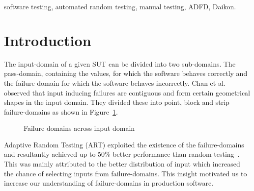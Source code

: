 \documentclass[conference]{IEEEtran}
\begin{document}
\begin{IEEEkeywords}
software testing, automated random testing, manual testing, ADFD, Daikon.
\end{IEEEkeywords}


\IEEEpeerreviewmaketitle




\section{Introduction}\label{sec:intro}

The input-domain of a given SUT can be divided into two sub-domains. The pass-domain, containing the values, for which the software behaves correctly and the failure-domain for which the software behaves incorrectly. Chan et al.~\cite{chan1996proportional} observed that input inducing failures are contiguous and form certain geometrical shapes in the input domain. They divided these into point, block and strip failure-domains as shown in Figure~\ref{fig:patterns2}.

\smallskip
\begin{figure} [H]
\centering
{}
\smallskip
\caption{Failure domains across input domain~\cite{chan1996proportional}}
\label{fig:patterns2}
\end{figure} 

Adaptive Random Testing (ART) exploited the existence of the failure-domains and resultantly achieved up to 50\% better performance than random testing~\cite{Chen2008}. This was mainly attributed to the better distribution of input which increased the chance of selecting inputs from failure-domains. This insight motivated us to increase our understanding of failure-domains in production software.
\end{document}
